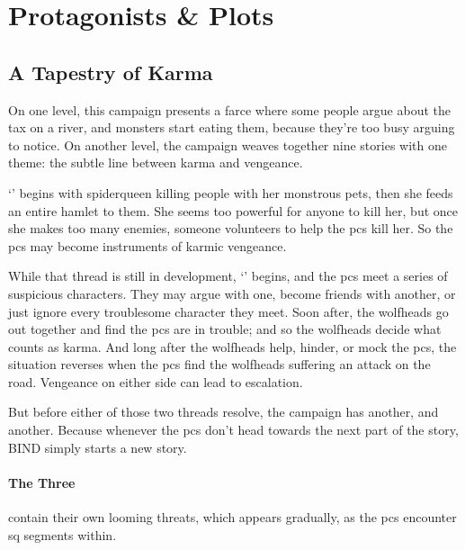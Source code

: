 \chapter{Protagonists \& Plots}
\label{sideQuestIntro}

\section{A Tapestry of Karma}
\label{sqSummaries}

\begin{multicols}{2}


\noindent
On one level, this \gls{campaign} presents a farce where some people argue about the tax on a river, and monsters start eating them, because they're too busy arguing to notice.
On another level, the \gls{campaign} weaves together nine stories with one theme: the subtle line between karma and vengeance.

`' begins with \gls{spiderqueen} killing people with her monstrous pets, then she feeds an entire hamlet to them.
She seems too powerful for anyone to kill her, but once she makes too many enemies, someone volunteers to help the \glspl{pc} kill her.
So the \glspl{pc} may become instruments of karmic vengeance.

While that thread is still in development, `' begins, and the \glspl{pc} meet a series of suspicious characters.
They may argue with one, become friends with another, or just ignore every troublesome character they meet.
Soon after, the \glspl{wolfhead} go out together and find the \glspl{pc} are in trouble; and so the \glspl{wolfhead} decide what counts as karma.
And long after the \glspl{wolfhead} help, hinder, or mock the \glspl{pc}, the situation reverses when the \glspl{pc} find the \glspl{wolfhead} suffering an attack on the road.
Vengeance on either side can lead to escalation.

But before either of those two threads resolve, the \gls{campaign} has another, and another.
Because whenever the \glspl{pc} don't head towards the next part of the story, BIND simply starts a new story.


\subsubsection{The Three }
contain their own looming threats, which appears gradually, as the \glspl{pc} encounter \gls{sq} \glspl{segment} within.



\end{multicols}
